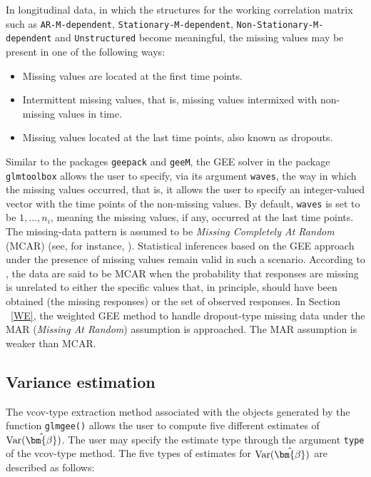 In longitudinal data, in which the structures for the working correlation matrix such as
{\tt AR-M-dependent}, {\tt Stationary-M-dependent}, {\tt Non-Stationary-M-dependent} and 
{\tt Unstructured} become meaningful, the missing values may be present in one of the following ways:
\begin{itemize}
\item Missing values are located at the first time points.
\item Intermittent missing values, that is, missing values intermixed with non-missing values in time.
\item Missing values located at the last time points, also known as dropouts.  
\end{itemize}
Similar to the packages {\tt geepack} and {\tt geeM}, the GEE solver in the package {\tt glmtoolbox} allows the user to specify, via its argument {\tt waves}, the way in which the missing values occurred, that is, it allows the user to specify an integer-valued vector with the time points of the non-missing values. By default, {\tt waves} is set to be $1,\ldots,n_i$, meaning the missing values, if any, occurred at the last time points. The missing-data pattern is assumed to be {\it Missing Completely At Random} (MCAR) (see, for instance, \cite{L88}). Statistical inferences based on the GEE approach under the presence of missing values remain valid in such a scenario. According to \cite{LF08}, the data are said to be MCAR when the probability that responses are missing is unrelated to either the specific values that, in principle, should have been obtained (the missing responses) or the set of observed responses. In Section \!~\ref{WE}, the weighted GEE method to handle dropout-type missing data under the MAR ({\it Missing At Random}) assumption is approached. The MAR assumption is weaker than MCAR.

\subsection{Variance estimation}
The vcov-type extraction method associated with the objects generated by the function {\tt glmgee()} allows the user to compute five different estimates of ${\rm Var}(\hat{\bm{\beta}})$. The user may specify the estimate type through the argument {\tt type} of the vcov-type method. 
The five types of estimates for ${\rm Var}(\hat{\bm{\beta}})$ are described as follows:

